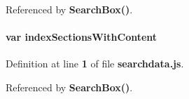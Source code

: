 Referenced by {\bf Search\+Box()}.

\paragraph[{index\+Sections\+With\+Content}]{\setlength{\rightskip}{0pt plus 5cm}var index\+Sections\+With\+Content}\label{searchdata_8js_a6250af3c9b54dee6efc5f55f40c78126}


Definition at line {\bf 1} of file {\bf searchdata.\+js}.



Referenced by {\bf Search\+Box()}.

